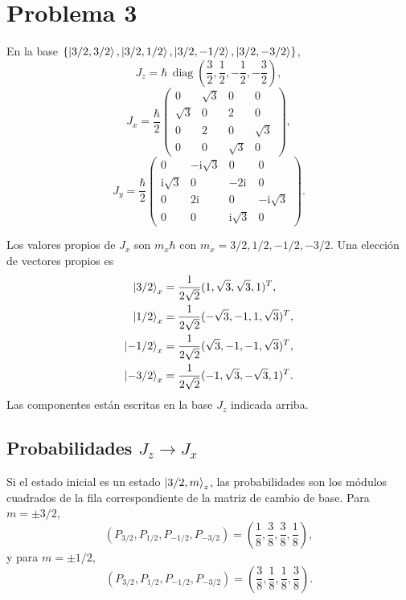 \documentclass[11pt,a4paper]{article}
\numberwithin{equation}{section}
\renewcommand{\boxed}[1]{#1}
\newcommand{\ii}{\mathrm i}
\newcommand{\hb}{\hbar}
\begin{document}
\section{Problema 3}
En la base $\{\ket{3/2,3/2},\ket{3/2,1/2},\ket{3/2,-1/2},\ket{3/2,-3/2}\}$,
\begin{equation}
J_z=\hb\,\operatorname{diag}\left(\frac32,\frac12,-\frac12,-\frac32\right),
\end{equation}
\begin{equation}
\boxed{J_x=\frac\hb2
\begin{pmatrix}
0&\sqrt3&0&0\\
\sqrt3&0&2&0\\
0&2&0&\sqrt3\\
0&0&\sqrt3&0
\end{pmatrix},}
\end{equation}
\begin{equation}
\boxed{J_y=\frac\hb2
\begin{pmatrix}
0&-\ii\sqrt3&0&0\\
\ii\sqrt3&0&-2\ii&0\\
0&2\ii&0&-\ii\sqrt3\\
0&0&\ii\sqrt3&0
\end{pmatrix}.}
\end{equation}

Los valores propios de $J_x$ son $m_x\hb$ con $m_x=3/2,1/2,-1/2,-3/2$. Una elección de vectores propios es
\begin{align}
\ket{3/2}_x&=\frac{1}{2\sqrt2}(1,\sqrt3,\sqrt3,1)^T,\\
\ket{1/2}_x&=\frac{1}{2\sqrt2}(-\sqrt3,-1,1,\sqrt3)^T,\\
\ket{-1/2}_x&=\frac{1}{2\sqrt2}(\sqrt3,-1,-1,\sqrt3)^T,\\
\ket{-3/2}_x&=\frac{1}{2\sqrt2}(-1,\sqrt3,-\sqrt3,1)^T.
\end{align}
Las componentes están escritas en la base $J_z$ indicada arriba.

\subsection{Probabilidades $J_z\to J_x$}
Si el estado inicial es un estado $\ket{3/2,m}_z$, las probabilidades son los módulos cuadrados de la fila correspondiente de la matriz de cambio de base. Para $m=\pm3/2$,
\begin{equation}
(P_{3/2},P_{1/2},P_{-1/2},P_{-3/2})=
\left(\frac18,\frac38,\frac38,\frac18\right),
\end{equation}
y para $m=\pm1/2$,
\begin{equation}
(P_{3/2},P_{1/2},P_{-1/2},P_{-3/2})=
\left(\frac38,\frac18,\frac18,\frac38\right).
\end{equation}
\end{document}
